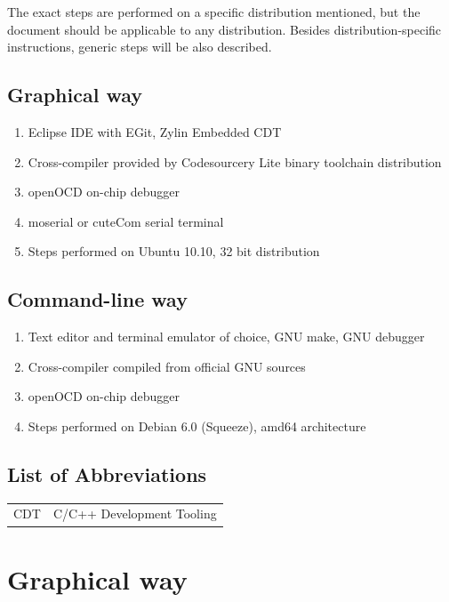 \documentclass[a4paper, 10pt]{article}
\begin{document}
The exact steps are performed on a specific distribution mentioned, but the
document should be applicable to any distribution. Besides distribution-specific
instructions, generic steps will be also described.

\subsection{Graphical way}

\begin{enumerate}
\item Eclipse IDE with EGit, Zylin Embedded CDT
\item Cross-compiler provided by Codesourcery Lite binary toolchain
	distribution
\item openOCD on-chip debugger
\item moserial or cuteCom serial terminal
\item Steps performed on Ubuntu 10.10, 32 bit distribution
\end{enumerate}

\subsection{Command-line way}

\begin{enumerate}
\item Text editor and terminal emulator of choice, GNU make, GNU debugger
\item Cross-compiler compiled from official GNU sources
\item openOCD on-chip debugger
\item Steps performed on Debian 6.0 (Squeeze), amd64 architecture
\end{enumerate}

\newpage

\tableofcontents
\newpage

\listoffigures
\newpage

\subsection*{List of Abbreviations}
	\begin{tabular}{ l l }
    CDT	    & C/C++ Development Tooling \\
	\end{tabular}
\newpage


\section{Graphical way}
\end{document}
